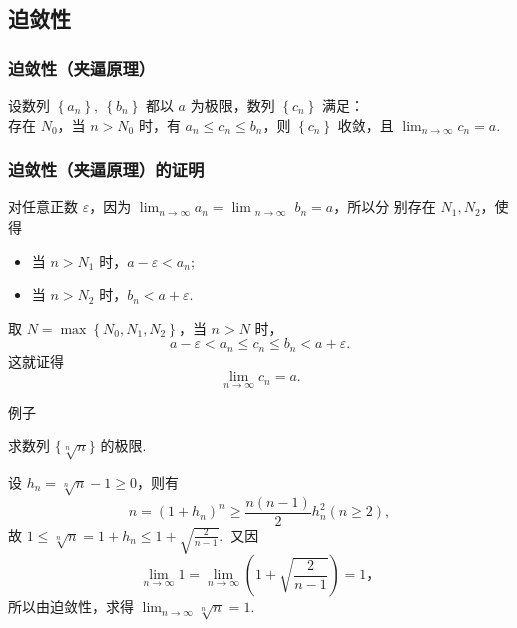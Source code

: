 \documentclass[mathserif]{beamer}
\begin{document}
\subsection{迫敛性}

\begin{frame}
\frametitle{迫敛性（夹逼原理）}
	\begin{thm}
	    \suojin 设数列 $\left\{a_n\right\},\ \left\{b_n\right\}$ 都以 $a$ 为极限，数列 $\left\{c_n\right\}$ 满足：\\
	    \suojin 存在 $N_0$，当 $n>N_0$ 时，有 $a_n \leq c_n \leq b_n$，则 $\left\{c_n\right\}$ 收敛，且 $\lim _{n \rightarrow \infty} c_n=a$.
		\end{thm}
\end{frame}



\begin{frame}
	\frametitle{迫敛性（夹逼原理）的证明}
	\begin{proofs}
		\suojin   对任意正数 $\varepsilon$，因为 $\lim _{n \rightarrow \infty} a_n=\lim _{\substack{n \rightarrow \infty}} b_n=a$，所以分 别存在 $N_1, N_2$，使得
		\begin{itemize}
			\item[] 当 $n>N_1$ 时，$a-\varepsilon<a_n$;
			\item[] 当 $n>N_2$ 时，$b_n<a+\varepsilon$. 
		\end{itemize}
		\suojin 取 $N=\max \left\{N_0, N_1, N_2\right\}$，当 $n>N$ 时，
		$$a-\varepsilon<a_n \leq c_n \leq b_n<a+\varepsilon.$$
		\suojin 这就证得  
		$$
		\lim _{n \rightarrow \infty} c_n=a. 
		$$
	\end{proofs}
\end{frame}





\begin{frame}{例子}%
	\begin{ex}
		\suojin 求数列 $\{\sqrt[n]{n}\}$ 的极限.   
	\end{ex}
\begin{jie}
	\suojin  设 $h_n=\sqrt[n]{n}-1 \geqslant 0$，则有
	$$
	n=\left(1+h_n\right)^n \geq \frac{n(n-1)}{2} h_n^2(n \geq 2),
	$$
	故 $1 \leq \sqrt[n]{n}=1+h_n \leq 1+\sqrt{\frac{2}{n-1}}$.\ 又因
	$$
	\lim _{n \rightarrow \infty} 1=\lim _{n \rightarrow \infty}\left(1+\sqrt{\frac{2}{n-1}}\right)=1 \text {，}
	$$
	所以由迫敛性，求得 $\lim _{n \rightarrow \infty} \sqrt[n]{n}=1$. 
\end{jie}
\end{frame}
\end{document}
